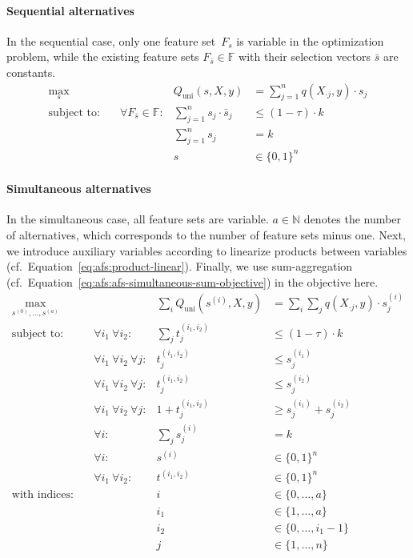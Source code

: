 \documentclass{article}
\theoremstyle{definition}
\begin{document}
\paragraph{Sequential alternatives}

In the sequential case, only one feature set~$F_s$ is variable in the optimization problem, while the existing feature sets $F_{\bar{s}} \in \mathbb{F}$ with their selection vectors $\bar{s}$ are constants.
%
\begin{equation}
	\begin{aligned}
		\max_s &\quad & Q_{\text{uni}}(s,X,y) &= \sum_{j=1}^{n} q(X_{\cdot{}j},y) \cdot s_j \\
		\text{subject to:} &\quad \forall F_{\bar{s}} \in \mathbb{F}: & \sum_{j=1}^n s_j \cdot \bar{s}_j &\leq (1 - \tau) \cdot k \\
		&\quad & \sum_{j=1}^n s_j &= k \\
		&\quad & s &\in \{0,1\}^n
	\end{aligned}
	\label{eq:afs:afs-sequential-complete}
\end{equation}
%
\paragraph{Simultaneous alternatives}

In the simultaneous case, all feature sets are variable.
$a \in \mathbb{N}$ denotes the number of alternatives, which corresponds to the number of feature sets minus one.
Next, we introduce auxiliary variables according to linearize products between variables (cf.~Equation~\ref{eq:afs:product-linear}).
Finally, we use sum-aggregation (cf.~Equation~\ref{eq:afs:afs-simultaneous-sum-objective}) in the objective here.
%
\begin{equation}
	\begin{aligned}
		\max_{s^{(0)}, \dots, s^{(a)}} &\quad & \sum_i Q_{\text{uni}}(s^{(i)},X,y) &= \sum_i \sum_j q(X_{\cdot{}j},y) \cdot s^{(i)}_j\\
		\text{subject to:} &\quad \forall i_1~\forall i_2: & \sum_j t^{(i_1,i_2)}_j &\leq (1 - \tau) \cdot k \\
		&\quad \forall i_1~\forall i_2~\forall j: & t^{(i_1,i_2)}_j &\leq s^{(i_1)}_j \\
		&\quad \forall i_1~\forall i_2~\forall j: & t^{(i_1,i_2)}_j &\leq s^{(i_2)}_j \\
		&\quad \forall i_1~\forall i_2~\forall j: & 1 + t^{(i_1,i_2)}_j &\geq s^{(i_1)}_j + s^{(i_2)}_j \\
		&\quad \forall i: & \sum_j s^{(i)}_j &= k \\
		&\quad \forall i: & s^{(i)} &\in \{0,1\}^n \\
		&\quad \forall i_1~\forall i_2: & t^{(i_1,i_2)} &\in \{0,1\}^n \\
		\text{with indices:} &\quad & i &\in \{0, \dots, a\} \\
		&\quad & i_1 &\in \{1, \dots, a\} \\
		&\quad & i_2 &\in \{0, \dots, i_1-1\} \\
		&\quad & j &\in \{1, \dots, n\}
	\end{aligned}
	\label{eq:afs:afs-simultaneous-complete}
\end{equation}
\end{document}
